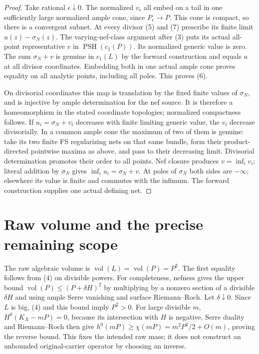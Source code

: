 \documentclass[11pt]{article}
\newcommand{\PSH}{\operatorname{PSH}}
\newcommand{\vol}{\operatorname{vol}}
\begin{document}
\begin{proof}
Take rational $\epsilon\downarrow0$. The normalized $v_\epsilon$
all embed on a tail in one sufficiently large normalized ample
cone, since $P_\epsilon\to P$. This cone is compact, so there
is a convergent subnet. At every divisor (5) and (7) prescribe its
finite limit $u(z)-\sigma_N(z)$. The varying-nef-class argument
after (3) puts its actual all-point representative $v$ in
$\PSH(c_1(P))$. Its normalized generic value is zero.
The sum $\sigma_N+v$ is genuine in $c_1(L)$ by the forward
construction and equals $u$ at all divisor coordinates.
Embedding both in one actual ample cone proves equality on all
analytic points, including all poles. This proves (6).

On divisorial coordinates this map is translation by the fixed
finite values of $\sigma_N$, and is injective by ample
determination for the nef source. It is therefore a homeomorphism
in the stated coordinate topologies; normalized compactness follows.
If $u_i=\sigma_N+v_i$ decreases with finite limiting generic
value, the $v_i$ decrease divisorially. In a common ample cone
the maximum of two of them is genuine: take its two finite FS
regularizing nets on that same bundle, form their product-directed
pointwise maxima as above, and pass to their decreasing limit.
Divisorial determination promotes their order to all points.
Nef closure produces
$v=\inf_i v_i$; literal addition by $\sigma_N$ gives
$\inf_i u_i=\sigma_N+v$. At poles of $\sigma_N$ both sides are
$-\infty$; elsewhere its value is finite and commutes with the
infimum. The forward construction supplies one actual defining net.
\end{proof}

\section{Raw volume and the precise remaining scope}
The raw algebraic volume is $\vol(L)=\vol(P)=P^2$.
The first equality follows from (4) on divisible powers.
For completeness, nefness gives the upper bound
$\vol(P)\leq(P+\delta H)^2$ by multiplying by a nonzero section
of a divisible $\delta H$ and using ample Serre vanishing and
surface Riemann--Roch. Let $\delta\downarrow0$.
Since $L$ is big, (4) and this bound imply $P^2>0$.
For large divisible $m$, $H^0(K_X-mP)=0$, because its
intersection with $H$ is negative. Serre duality and
Riemann--Roch then give
$h^0(mP)\geq\chi(mP)=m^2P^2/2+O(m)$, proving the reverse
bound. This fixes the intended raw mass; it does not construct
an unbounded original-carrier operator by choosing an inverse.
\end{document}
